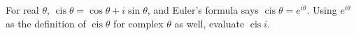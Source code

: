 For real $\theta$, $\operatorname{cis}\theta=\cos\theta+i\sin\theta$, and Euler's formula says $\operatorname{cis}\theta=e^{i\theta}$. Using $e^{i\theta}$ as the definition of $\operatorname{cis}\theta$ for complex $\theta$ as well, evaluate $\operatorname{cis} i$.
